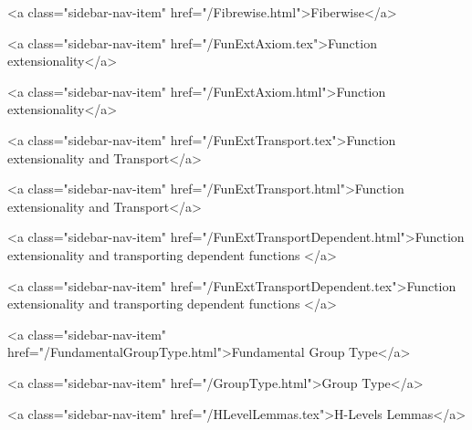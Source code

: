       
    
      
        
          <a class="sidebar-nav-item" href="/Fibrewise.html">Fiberwise</a>
        
      
    
      
        
          <a class="sidebar-nav-item" href="/FunExtAxiom.tex">Function extensionality</a>
        
      
    
      
        
          <a class="sidebar-nav-item" href="/FunExtAxiom.html">Function extensionality</a>
        
      
    
      
        
          <a class="sidebar-nav-item" href="/FunExtTransport.tex">Function extensionality and Transport</a>
        
      
    
      
        
          <a class="sidebar-nav-item" href="/FunExtTransport.html">Function extensionality and Transport</a>
        
      
    
      
        
          <a class="sidebar-nav-item" href="/FunExtTransportDependent.html">Function extensionality and transporting dependent functions </a>
        
      
    
      
        
          <a class="sidebar-nav-item" href="/FunExtTransportDependent.tex">Function extensionality and transporting dependent functions </a>
        
      
    
      
        
          <a class="sidebar-nav-item" href="/FundamentalGroupType.html">Fundamental Group Type</a>
        
      
    
      
        
          <a class="sidebar-nav-item" href="/GroupType.html">Group Type</a>
        
      
    
      
        
          <a class="sidebar-nav-item" href="/HLevelLemmas.tex">H-Levels Lemmas</a>
        
      
    
